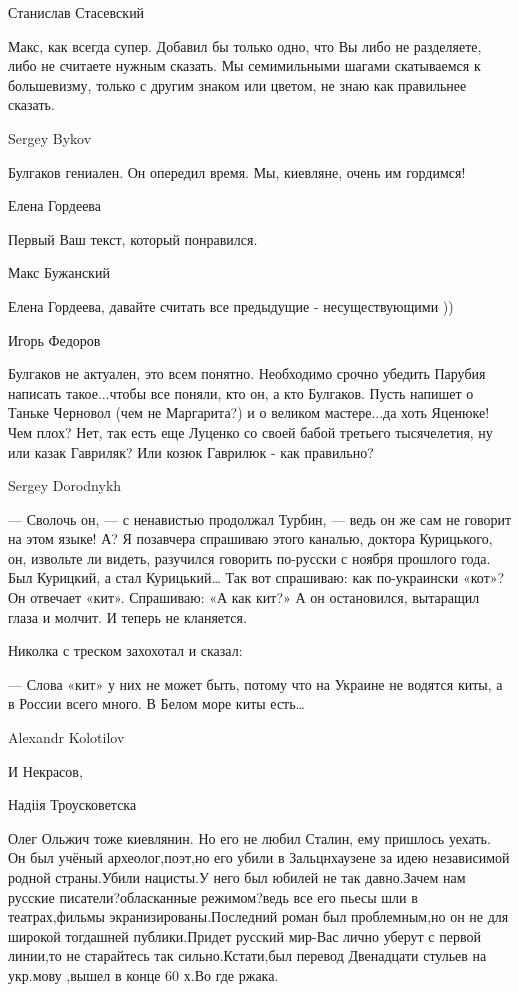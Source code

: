 Станислав Стасевский

Макс, как всегда супер. Добавил бы только одно, что Вы либо не разделяете, либо
не считаете нужным сказать. Мы семимильными шагами скатываемся к большевизму,
только с другим знаком или цветом, не знаю как правильнее сказать.

Sergey Bykov

Булгаков гениален. Он опередил время. Мы, киевляне, очень им гордимся!

Елена Гордеева

Первый Ваш текст, который понравился.

Макс Бужанский

Елена Гордеева, давайте считать все предыдущие - несуществующими ))

Игорь Федоров

Булгаков не актуален, это всем понятно. Необходимо срочно убедить Парубия
написать такое...чтобы все поняли, кто он, а кто Булгаков. Пусть напишет о
Таньке Черновол (чем не Маргарита?) и о великом мастере...да хоть Яценюке! Чем
плох? Нет, так есть еще Луценко со своей бабой третьего тысячелетия, ну или
казак Гавриляк? Или козюк Гаврилюк - как правильно?

Sergey Dorodnykh

— Сволочь он, — с ненавистью продолжал Турбин, — ведь он же сам не говорит на
этом языке! А? Я позавчера спрашиваю этого каналью, доктора Курицького, он,
извольте ли видеть, разучился говорить по-русски с ноября прошлого года. Был
Курицкий, а стал Курицький… Так вот спрашиваю: как по-украински «кот»? Он
отвечает «кит». Спрашиваю: «А как кит?» А он остановился, вытаращил глаза и
молчит. И теперь не кланяется.

Николка с треском захохотал и сказал:

— Слова «кит» у них не может быть, потому что на Украине не водятся киты, а в
России всего много. В Белом море киты есть…

Alexandr Kolotilov

И Некрасов,

Надіія Троусковетска

Олег Ольжич тоже киевлянин. Но его не любил Сталин, ему пришлось уехать. Он был
учёный археолог,поэт,но его убили в Зальцнхаузене за идею независимой родной
страны.Убили нацисты.У него был юбилей не так давно.Зачем нам русские
писатели?обласканные режимом?ведь все его пьесы шли в театрах,фильмы
экранизированы.Последний роман был проблемным,но он не для широкой тогдашней
публики.Придет русский мир-Вас лично уберут с первой линии,то не старайтесь так
сильно.Кстати,был перевод Двенадцати стульев на укр.мову ,вышел в конце 60 х.Во
где ржака.

